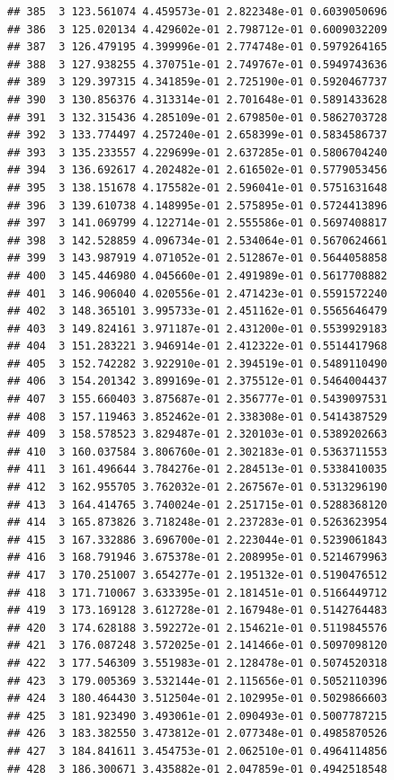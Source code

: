 \documentclass[article]{jss}\usepackage[]{graphicx}\usepackage[]{xcolor}
\makeatletter
\newenvironment{kframe}{%
 \def\at@end@of@kframe{}%
 \ifinner\ifhmode%
  \def\at@end@of@kframe{\end{minipage}}%
  \begin{minipage}{\columnwidth}%
 \fi\fi%
 \def\FrameCommand##1{\hskip\@totalleftmargin \hskip-\fboxsep
 \colorbox{shadecolor}{##1}\hskip-\fboxsep
     \hskip-\linewidth \hskip-\@totalleftmargin \hskip\columnwidth}%
 \MakeFramed {\advance\hsize-\width
   \@totalleftmargin\z@ \linewidth\hsize
   \@setminipage}}%
 {\par\unskip\endMakeFramed%
 \at@end@of@kframe}
\newenvironment{knitrout}{}{} %
\makeatother
\begin{document}
\begin{knitrout}
\begin{kframe}
\begin{verbatim}
## 385  3 123.561074 4.459573e-01 2.822348e-01 0.6039050696
## 386  3 125.020134 4.429602e-01 2.798712e-01 0.6009032209
## 387  3 126.479195 4.399996e-01 2.774748e-01 0.5979264165
## 388  3 127.938255 4.370751e-01 2.749767e-01 0.5949743636
## 389  3 129.397315 4.341859e-01 2.725190e-01 0.5920467737
## 390  3 130.856376 4.313314e-01 2.701648e-01 0.5891433628
## 391  3 132.315436 4.285109e-01 2.679850e-01 0.5862703728
## 392  3 133.774497 4.257240e-01 2.658399e-01 0.5834586737
## 393  3 135.233557 4.229699e-01 2.637285e-01 0.5806704240
## 394  3 136.692617 4.202482e-01 2.616502e-01 0.5779053456
## 395  3 138.151678 4.175582e-01 2.596041e-01 0.5751631648
## 396  3 139.610738 4.148995e-01 2.575895e-01 0.5724413896
## 397  3 141.069799 4.122714e-01 2.555586e-01 0.5697408817
## 398  3 142.528859 4.096734e-01 2.534064e-01 0.5670624661
## 399  3 143.987919 4.071052e-01 2.512867e-01 0.5644058858
## 400  3 145.446980 4.045660e-01 2.491989e-01 0.5617708882
## 401  3 146.906040 4.020556e-01 2.471423e-01 0.5591572240
## 402  3 148.365101 3.995733e-01 2.451162e-01 0.5565646479
## 403  3 149.824161 3.971187e-01 2.431200e-01 0.5539929183
## 404  3 151.283221 3.946914e-01 2.412322e-01 0.5514417968
## 405  3 152.742282 3.922910e-01 2.394519e-01 0.5489110490
## 406  3 154.201342 3.899169e-01 2.375512e-01 0.5464004437
## 407  3 155.660403 3.875687e-01 2.356777e-01 0.5439097531
## 408  3 157.119463 3.852462e-01 2.338308e-01 0.5414387529
## 409  3 158.578523 3.829487e-01 2.320103e-01 0.5389202663
## 410  3 160.037584 3.806760e-01 2.302183e-01 0.5363711553
## 411  3 161.496644 3.784276e-01 2.284513e-01 0.5338410035
## 412  3 162.955705 3.762032e-01 2.267567e-01 0.5313296190
## 413  3 164.414765 3.740024e-01 2.251715e-01 0.5288368120
## 414  3 165.873826 3.718248e-01 2.237283e-01 0.5263623954
## 415  3 167.332886 3.696700e-01 2.223044e-01 0.5239061843
## 416  3 168.791946 3.675378e-01 2.208995e-01 0.5214679963
## 417  3 170.251007 3.654277e-01 2.195132e-01 0.5190476512
## 418  3 171.710067 3.633395e-01 2.181451e-01 0.5166449712
## 419  3 173.169128 3.612728e-01 2.167948e-01 0.5142764483
## 420  3 174.628188 3.592272e-01 2.154621e-01 0.5119845576
## 421  3 176.087248 3.572025e-01 2.141466e-01 0.5097098120
## 422  3 177.546309 3.551983e-01 2.128478e-01 0.5074520318
## 423  3 179.005369 3.532144e-01 2.115656e-01 0.5052110396
## 424  3 180.464430 3.512504e-01 2.102995e-01 0.5029866603
## 425  3 181.923490 3.493061e-01 2.090493e-01 0.5007787215
## 426  3 183.382550 3.473812e-01 2.077348e-01 0.4985870526
## 427  3 184.841611 3.454753e-01 2.062510e-01 0.4964114856
## 428  3 186.300671 3.435882e-01 2.047859e-01 0.4942518548

\end{verbatim}
\end{kframe}
\end{knitrout}
\end{document}

